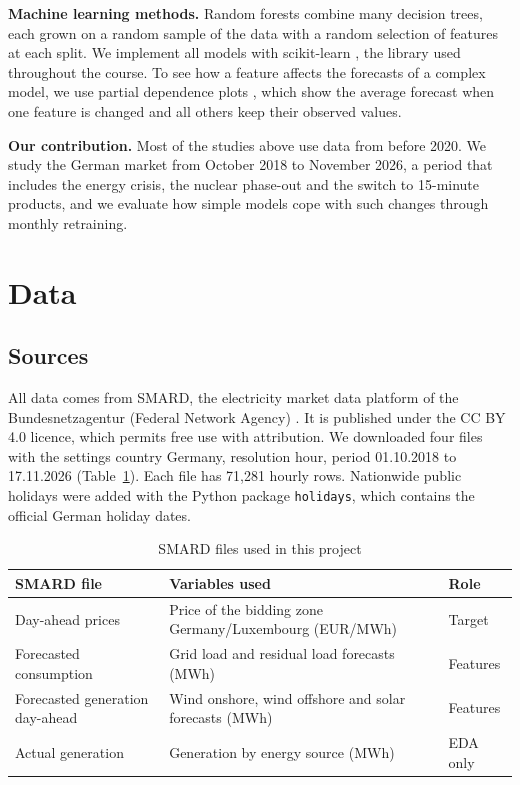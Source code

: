 \documentclass[12pt,oneside]{article}
\begin{document}
\textbf{Machine learning methods.} Random forests \citep{breiman2001} combine many decision trees, each grown on a random sample of the data with a random selection of features at each split. We implement all models with scikit-learn \citep{pedregosa2011}, the library used throughout the course. To see how a feature affects the forecasts of a complex model, we use partial dependence plots \citep{friedman2001}, which show the average forecast when one feature is changed and all others keep their observed values.

\textbf{Our contribution.} Most of the studies above use data from before 2020. We study the German market from October 2018 to November 2026, a period that includes the energy crisis, the nuclear phase-out and the switch to 15-minute products, and we evaluate how simple models cope with such changes through monthly retraining.

\section{Data} \label{sec:data}

\subsection{Sources}

All data comes from SMARD, the electricity market data platform of the Bundesnetzagentur (Federal Network Agency) \citep{smard2026}. It is published under the CC BY 4.0 licence, which permits free use with attribution. We downloaded four files with the settings country Germany, resolution hour, period 01.10.2018 to 17.11.2026 (Table~\ref{tab:files}). Each file has 71,281 hourly rows. Nationwide public holidays were added with the Python package \texttt{holidays}, which contains the official German holiday dates.

\begin{table}[!htbp]
    \centering
    \caption{SMARD files used in this project}
    \begin{tabularx}{\textwidth}{lXl}
        \toprule
        SMARD file & Variables used & Role \\
        \midrule
        Day-ahead prices & Price of the bidding zone Germany/Luxembourg (EUR/MWh) & Target \\
        Forecasted consumption & Grid load and residual load forecasts (MWh) & Features \\
        Forecasted generation day-ahead & Wind onshore, wind offshore and solar forecasts (MWh) & Features \\
        Actual generation & Generation by energy source (MWh) & EDA only \\
        \bottomrule
    \end{tabularx}
    \label{tab:files}
\end{table}
\end{document}

